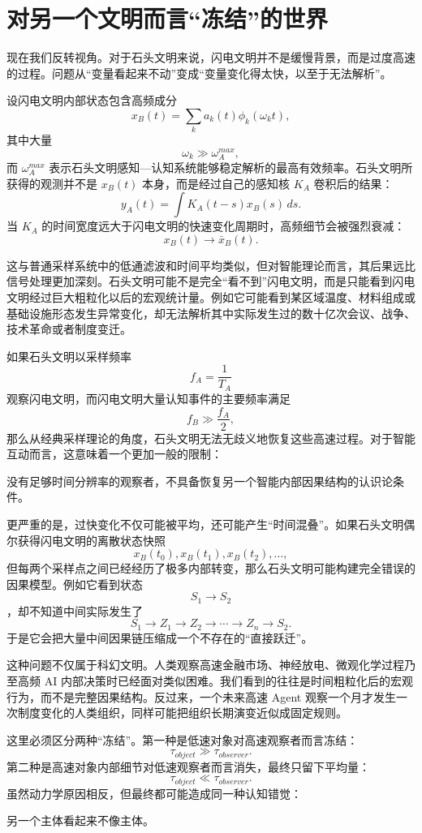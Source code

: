 \section{对另一个文明而言“冻结”的世界}

现在我们反转视角。对于石头文明来说，闪电文明并不是缓慢背景，而是过度高速的过程。问题从“变量看起来不动”变成“变量变化得太快，以至于无法解析”。

设闪电文明内部状态包含高频成分
\[
x_B(t)
=
\sum_k a_k(t)\phi_k(\omega_k t),
\]
其中大量
\[
\omega_k
\gg
\omega_A^{max},
\]
而 $\omega_A^{max}$ 表示石头文明感知—认知系统能够稳定解析的最高有效频率。石头文明所获得的观测并不是 $x_B(t)$ 本身，而是经过自己的感知核 $K_A$ 卷积后的结果：
\[
y_A(t)
=
\int
K_A(t-s)x_B(s)\,ds.
\]
当 $K_A$ 的时间宽度远大于闪电文明的快速变化周期时，高频细节会被强烈衰减：
\[
x_B(t)
\longrightarrow
\bar{x}_B(t).
\]

这与普通采样系统中的低通滤波和时间平均类似，但对智能理论而言，其后果远比信号处理更加深刻。石头文明可能不是完全“看不到”闪电文明，而是只能看到闪电文明经过巨大粗粒化以后的宏观统计量。例如它可能看到某区域温度、材料组成或基础设施形态发生异常变化，却无法解析其中实际发生过的数十亿次会议、战争、技术革命或者制度变迁。

如果石头文明以采样频率
\[
f_A=\frac{1}{T_A}
\]
观察闪电文明，而闪电文明大量认知事件的主要频率满足
\[
f_B\gg\frac{f_A}{2},
\]
那么从经典采样理论的角度，石头文明无法无歧义地恢复这些高速过程。对于智能互动而言，这意味着一个更加一般的限制：

\begin{statementbox}
没有足够时间分辨率的观察者，不具备恢复另一个智能内部因果结构的认识论条件。
\end{statementbox}

更严重的是，过快变化不仅可能被平均，还可能产生“时间混叠”。如果石头文明偶尔获得闪电文明的离散状态快照
\[
x_B(t_0),x_B(t_1),x_B(t_2),\dots,
\]
但每两个采样点之间已经经历了极多内部转变，那么石头文明可能构建完全错误的因果模型。例如它看到状态
\[
S_1\rightarrow S_2
\]
，却不知道中间实际发生了
\[
S_1\to Z_1\to Z_2\to\cdots\to Z_n\to S_2.
\]
于是它会把大量中间因果链压缩成一个不存在的“直接跃迁”。

这种问题不仅属于科幻文明。人类观察高速金融市场、神经放电、微观化学过程乃至高频 AI 内部决策时已经面对类似困难。我们看到的往往是时间粗粒化后的宏观行为，而不是完整因果结构。反过来，一个未来高速 Agent 观察一个月才发生一次制度变化的人类组织，同样可能把组织长期演变近似成固定规则。

这里必须区分两种“冻结”。第一种是低速对象对高速观察者而言冻结：
\[
\tau_{object}\gg\tau_{observer}.
\]
第二种是高速对象内部细节对低速观察者而言消失，最终只留下平均量：
\[
\tau_{object}\ll\tau_{observer}.
\]
虽然动力学原因相反，但最终都可能造成同一种认知错觉：
\begin{statementbox}
另一个主体看起来不像主体。
\end{statementbox}

